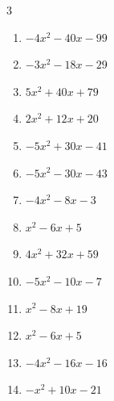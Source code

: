 \begin{multicols}{3}
\begin{enumerate}
  \item $-4x^{2}-40x-99$


  \item $-3x^{2}-18x-29$


  \item $5x^{2}+40x+79$


  \item $2x^{2}+12x+20$


  \item $-5x^{2}+30x-41$


  \item $-5x^{2}-30x-43$


  \item $-4x^{2}-8x-3$


  \item $x^{2}-6x+5$


\columnbreak %

  \item $4x^{2}+32x+59$


  \item $-5x^{2}-10x-7$


  \item $x^{2}-8x+19$


  \item $x^{2}-6x+5$


  \item $-4x^{2}-16x-16$


  \item $-x^{2}+10x-21$


\end{enumerate}
\end{multicols}
